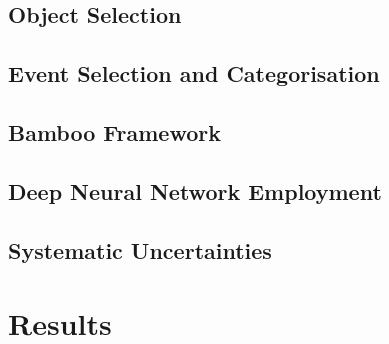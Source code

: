 \subsection{Object Selection}

\subsection{Event Selection and Categorisation}

\subsection{Bamboo Framework}

\subsection{Deep Neural Network Employment}

\subsection{Systematic Uncertainties}

\section{Results}